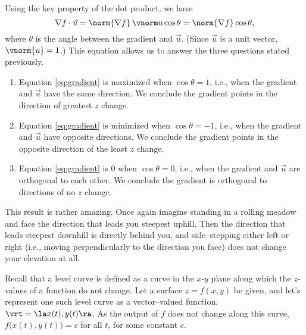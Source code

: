 Using the key property of the dot product, we have
\begin{equation}\nabla f\cdot \vec u = \norm{\nabla f}\,\vnorm u \cos \theta = \norm{\nabla f}\cos \theta, \label{eq:gradient}\end{equation}
where $\theta$ is the angle between the gradient and $\vec u$. (Since $\vec u$ is a unit vector, $\vnorm{u} = 1$.) This equation allows us to answer the three questions stated previously.

\begin{enumerate}
	\item Equation \ref{eq:gradient} is maximized when $\cos \theta =1$, i.e., when the gradient and $\vec u$ have the same direction. We conclude the gradient points in the direction of greatest $z$ change.
	\item	Equation \ref{eq:gradient} is minimized when $\cos \theta = -1$, i.e., when the gradient and $\vec u$ have opposite directions. We conclude the gradient points in the opposite direction of the least $z$ change.
	\item Equation \ref{eq:gradient} is 0 when $\cos \theta = 0$, i.e., when the gradient and $\vec u$ are orthogonal to each other. We conclude the gradient is orthogonal to directions of no $z$ change. 
\end{enumerate}

This result is rather amazing. Once again imagine standing in a rolling meadow and face the  direction that leads you steepest uphill. Then the direction that leads steepest downhill is directly behind you, and side--stepping either left or right (i.e., moving perpendicularly to the direction you face) does not change your elevation at all.


Recall that a level curve is defined as a curve in the $x$-$y$ plane along which the $z$-values of a function do not change. Let a surface $z=f(x,y)$ be given, and let's represent one such level curve as a vector--valued function, $\vrt = \la x(t), y(t)\ra$. As the output of $f$ does not change along this curve, $f\big(x(t),y(t)\big) = c$ for all $t$, for some constant $c$.

